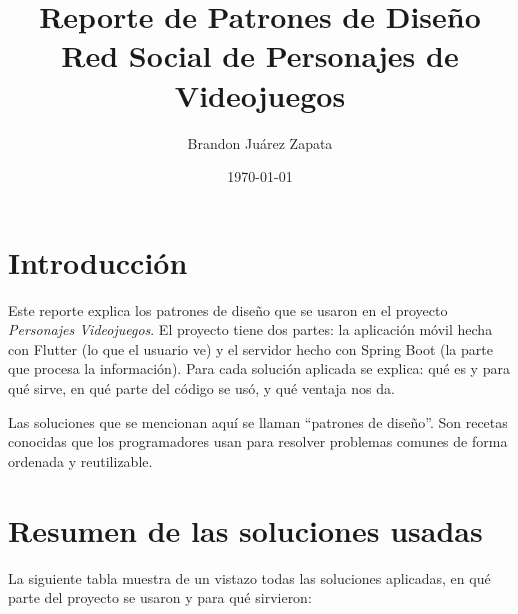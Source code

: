 \documentclass[12pt,a4paper]{article}
\title{Reporte de Patrones de Diseño\\Red Social de Personajes de Videojuegos}
\author{Brandon Juárez Zapata}
\date{\today}
\begin{document}
\maketitle

\section{Introducción}
Este reporte explica los patrones de diseño que se usaron en el proyecto \textit{Personajes Videojuegos}. El proyecto tiene dos partes: la aplicación móvil hecha con Flutter (lo que el usuario ve) y el servidor hecho con Spring Boot (la parte que procesa la información). Para cada solución aplicada se explica: qué es y para qué sirve, en qué parte del código se usó, y qué ventaja nos da.


Las soluciones que se mencionan aquí se llaman ``patrones de diseño''. Son recetas conocidas que los programadores usan para resolver problemas comunes de forma ordenada y reutilizable.

\section{Resumen de las soluciones usadas}
La siguiente tabla muestra de un vistazo todas las soluciones aplicadas, en qué parte del proyecto se usaron y para qué sirvieron:
\end{document}
